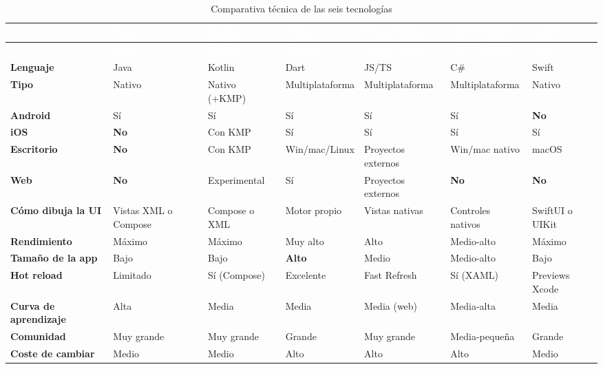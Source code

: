 \documentclass[11pt,a4paper]{article}
\begin{document}
	{\footnotesize
		\begin{xltabular}{\textwidth}{@{}>{\RaggedRight\arraybackslash}p{2.5cm} >{\RaggedRight\arraybackslash}X >{\RaggedRight\arraybackslash}X >{\RaggedRight\arraybackslash}X >{\RaggedRight\arraybackslash}X >{\RaggedRight\arraybackslash}X >{\RaggedRight\arraybackslash}X@{}}
			\caption{Comparativa técnica de las seis tecnologías}\label{tab:tec-comparativa}\\
			\toprule
			\textcolor{white}{\sffamily\bfseries} & \textcolor{white}{\sffamily\bfseries Java} & \textcolor{white}{\sffamily\bfseries Kotlin} & \textcolor{white}{\sffamily\bfseries Flutter} & \textcolor{white}{\sffamily\bfseries React Native} & \textcolor{white}{\sffamily\bfseries .NET MAUI} & \textcolor{white}{\sffamily\bfseries Swift} \\
			\midrule
			\endfirsthead
			\toprule
			\textcolor{white}{\sffamily\bfseries} & \textcolor{white}{\sffamily\bfseries Java} & \textcolor{white}{\sffamily\bfseries Kotlin} & \textcolor{white}{\sffamily\bfseries Flutter} & \textcolor{white}{\sffamily\bfseries React Native} & \textcolor{white}{\sffamily\bfseries .NET MAUI} & \textcolor{white}{\sffamily\bfseries Swift} \\
			\midrule
			\endhead
			\bottomrule
			\endlastfoot
			\textbf{Lenguaje} & Java & Kotlin & Dart & JS/TS & C\# & Swift \\
			\textbf{Tipo} & Nativo & Nativo (+KMP) & Multiplataforma & Multiplataforma & Multiplataforma & Nativo \\
			\textbf{Android} & Sí & Sí & Sí & Sí & Sí & \textbf{No} \\
			\textbf{iOS} & \textbf{No} & Con KMP & Sí & Sí & Sí & Sí \\
			\textbf{Escritorio} & \textbf{No} & Con KMP & Win/mac/Linux & Proyectos externos & Win/mac nativo & macOS \\
			\textbf{Web} & \textbf{No} & Experimental & Sí & Proyectos externos & \textbf{No} & \textbf{No} \\
			\textbf{Cómo dibuja la UI} & Vistas XML o Compose & Compose o XML & Motor propio & Vistas nativas & Controles nativos & SwiftUI o UIKit \\
			\textbf{Rendimiento} & Máximo & Máximo & Muy alto & Alto & Medio-alto & Máximo \\
			\textbf{Tamaño de la app} & Bajo & Bajo & \textbf{Alto} & Medio & Medio-alto & Bajo \\
			\textbf{Hot reload} & Limitado & Sí (Compose) & Excelente & Fast Refresh & Sí (XAML) & Previews Xcode \\
			\textbf{Curva de aprendizaje} & Alta & Media & Media & Media (web) & Media-alta & Media \\
			\textbf{Comunidad} & Muy grande & Muy grande & Grande & Muy grande & Media-pequeña & Grande \\
			\textbf{Coste de cambiar} & Medio & Medio & Alto & Alto & Alto & Medio \\
		\end{xltabular}
	}
	
\end{document}

